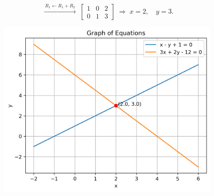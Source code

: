 \documentclass[journal]{IEEEtran}
\begin{document}
\[
\;\xrightarrow{\,R_1 \leftarrow R_1 + R_2\,}\;
\left[
\begin{array}{cc|c}
	1 & 0 & 2\\
	0 & 1 & 3
\end{array}
\right]
\;\Longrightarrow\;
x = 2,\quad y = 3.
\]


\begin{figure}[H]
	\centering
	\includegraphics[width=1\linewidth]{figs/equations_solution}
	\caption{}
	\label{fig:equationssolution}
\end{figure}
\end{document}
